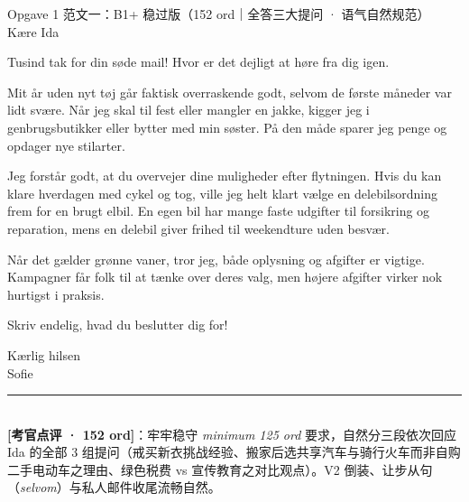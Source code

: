 \begin{emailbox}{Opgave 1 范文一：B1+ 稳过版（152 ord｜全答三大提问 · 语气自然规范）}
Kære Ida

\vspace{0.25em}
Tusind tak for din søde mail! Hvor er det dejligt at høre fra dig igen.

\vspace{0.25em}
Mit år uden nyt tøj går faktisk overraskende godt, selvom de første måneder var lidt svære. Når jeg skal til fest eller mangler en jakke, kigger jeg i genbrugsbutikker eller bytter med min søster. På den måde sparer jeg penge og opdager nye stilarter.

\vspace{0.25em}
Jeg forstår godt, at du overvejer dine muligheder efter flytningen. Hvis du kan klare hverdagen med cykel og tog, ville jeg helt klart vælge en delebilsordning frem for en brugt elbil. En egen bil har mange faste udgifter til forsikring og reparation, mens en delebil giver frihed til weekendture uden besvær.

\vspace{0.25em}
Når det gælder grønne vaner, tror jeg, både oplysning og afgifter er vigtige. Kampagner får folk til at tænke over deres valg, men højere afgifter virker nok hurtigst i praksis.

\vspace{0.25em}
Skriv endelig, hvad du beslutter dig for!

\vspace{0.25em}
Kærlig hilsen\\
Sofie

\vspace{0.3em}
\rule{\linewidth}{0.4pt}\\[0.2em]
\small\textbf{\color{NCDTeal}[考官点评 · 152 ord]}：牢牢稳守 \textit{minimum 125 ord} 要求，自然分三段依次回应 Ida 的全部 3 组提问（戒买新衣挑战经验、搬家后选共享汽车与骑行火车而非自购二手电动车之理由、绿色税费 vs 宣传教育之对比观点）。V2 倒装、让步从句（\textit{selvom}）与私人邮件收尾流畅自然。
\end{emailbox}

